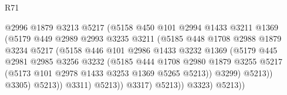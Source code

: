 \begin{lexlean}{R71}
\begin{coremodule}
                                    @2996
                                    @1879
                                    @3213
                                    @5217
                                    (@5158
                                      @450
                                      @101
                                      @2994
                                      @1433
                                      @3211
                                      @1369
                                      (@5179
                                        @449
                                        @2989
                                        @2993
                                        @3235
                                        @3211
                                        (@5185
                                          @448
                                          @1708
                                          @2988
                                          @1879
                                          @3234
                                          @5217
                                          (@5158
                                            @446
                                            @101
                                            @2986
                                            @1433
                                            @3232
                                            @1369
                                            (@5179
                                              @445
                                              @2981
                                              @2985
                                              @3256
                                              @3232
                                              (@5185
                                                @444
                                                @1708
                                                @2980
                                                @1879
                                                @3255
                                                @5217
                                                (@5173 @101 @2978 @1433 @3253 @1369 @5265 @5213))
                                              @3299)
                                            @5213))
                                        @3305)
                                      @5213))
                                  @3311)
                                @5213))
                            @3317)
                          @5213))
                      @3323)
                    @5213))

\end{coremodule}
\end{lexlean}
